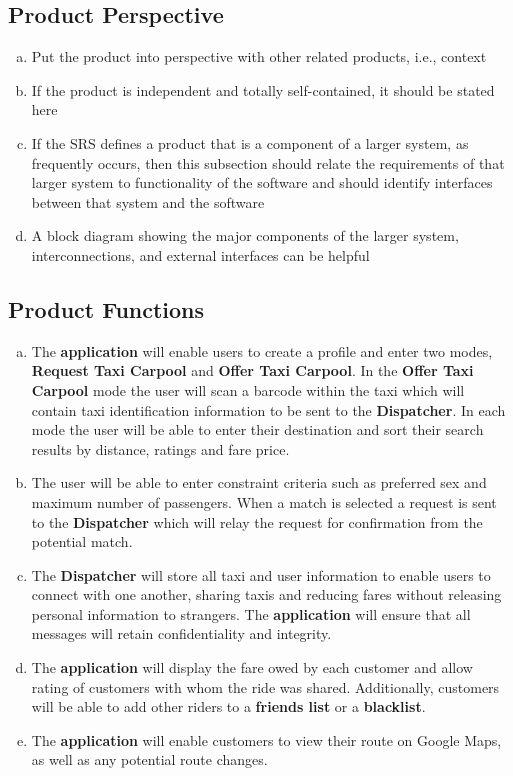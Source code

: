 \documentclass[english]{article}
\begin{document}
\subsection{Product Perspective}
\label{sub:product_perspective}
\begin{enumerate}[a)]
	\item Put the product into perspective with other related products, i.e., context
	\item If the product is independent and totally self-contained, it should be stated here
	\item If the SRS defines a product that is a component of a larger system, as frequently occurs, then this subsection should relate the requirements of that larger system to functionality of the software and should identify interfaces between that system and the software
	\item A block diagram showing the major components of the larger system, interconnections, and external interfaces can be helpful
\end{enumerate}

\subsection{Product Functions}
\label{sub:product_functions}
\begin{enumerate}[a)]
\item The \textbf{application} will enable users to create a profile and enter two modes, \textbf{Request Taxi Carpool} and \textbf{Offer Taxi Carpool}. In the \textbf{Offer Taxi Carpool} mode the user will scan a barcode within the taxi which will contain taxi identification information to be sent to the \textbf{Dispatcher}. In each mode the user will be able to enter their destination and sort their search results by distance, ratings and fare price. 
	
	\item The user will be able to enter constraint criteria such as preferred sex and maximum number of passengers. When a match is selected a request is sent to the \textbf{Dispatcher} which will relay the request for confirmation from the potential match. 
	
	\item The \textbf{Dispatcher} will store all taxi and user information to enable users to connect with one another, sharing taxis and reducing fares without releasing personal information to strangers. The \textbf{application} will ensure that all messages will retain confidentiality and integrity.
	
	\item The \textbf{application} will display the fare owed by each customer and allow rating of customers with whom the ride was shared. Additionally, customers will be able to add other riders to a \textbf{friends list} or a \textbf{blacklist}.
	
	\item The \textbf{application} will enable customers to view their route on Google Maps, as well as any potential route changes.
\end{enumerate}
\end{document}
